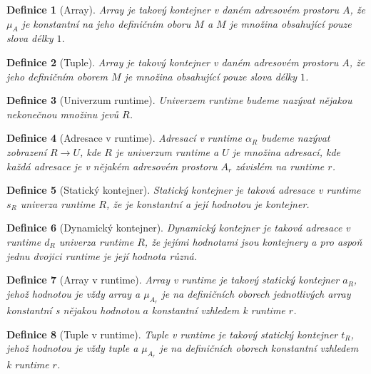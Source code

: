\documentclass[a4paper,12pt]{article}
\newtheorem{definition}{Definice}[section]
\begin{document}
\begin{definition}[Array]
    Array je takový kontejner v daném adresovém prostoru $A$, že $\mu_A$ je konstantní na jeho definičním oboru $M$ a $M$ je množina obsahující pouze slova délky $1$.
\end{definition}

\begin{definition}[Tuple]
    Array je takový kontejner v daném adresovém prostoru $A$, že jeho definičním oborem $M$ je množina obsahující pouze slova délky $1$.
\end{definition}

\begin{definition}[Univerzum runtime]
    Univerzem runtime budeme nazývat nějakou nekonečnou množinu jevů $R$.
\end{definition}

\begin{definition}[Adresace v runtime]
    Adresací v runtime $\alpha_R$ budeme nazývat zobrazení $R \to U$, kde $R$ je univerzum runtime a $U$ je množina adresací, kde každá adresace je v nějakém adresovém prostoru $A_r$ závislém na runtime $r$.
\end{definition}

\begin{definition}[Statický kontejner]
    Statický kontejner je taková adresace v runtime $s_R$ univerza runtime $R$, že je konstantní a její hodnotou je kontejner.
\end{definition}

\begin{definition}[Dynamický kontejner]
    Dynamický kontejner je taková adresace v runtime $d_R$ univerza runtime $R$, že jejími hodnotami jsou kontejnery a pro aspoň jednu dvojici runtime je její hodnota různá.
\end{definition}

\begin{definition}[Array v runtime]
    Array v runtime je takový statický kontejner $a_R$, jehož hodnotou je vždy array a $\mu_{A_r}$ je na definičních oborech jednotlivých array konstantní s nějakou hodnotou $a$ konstantní vzhledem k runtime $r$.
\end{definition}

\begin{definition}[Tuple v runtime]
    Tuple v runtime je takový statický kontejner $t_R$, jehož hodnotou je vždy tuple a $\mu_{A_r}$ je na definičních oborech konstantní vzhledem k runtime $r$.
\end{definition}
\end{document}
